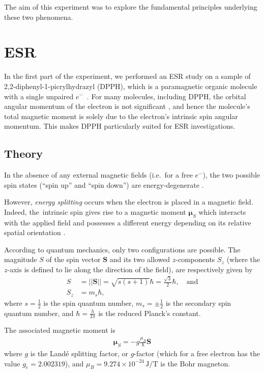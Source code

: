 \documentclass[a4paper]{jpconf}
\numberwithin{equation}{section}
\begin{document}
The aim of this experiment was to explore the fundamental principles underlying these two phenomena.

\section{ESR}
In the first part of the experiment, we performed an ESR study on a sample of 2,2-diphenyl-1-picrylhydrazyl (DPPH), which is a paramagnetic organic molecule with a single unpaired $e^-$~\cite{MacLaren}. For many molecules, including DPPH, the orbital angular momentum of the electron is not significant \cite{MacLaren},
and hence the molecule\textquoteright s total magnetic moment is solely due to the electron\textquoteright s intrinsic spin angular momentum. This makes DPPH particularly suited for ESR investigations.
 
\subsection{Theory}\label{section: theory}
In the absence of any external magnetic fields (i.e.\ for a free $e^-$), the two possible spin states (``spin up'' and ``spin down'') are energy-degenerate \cite{Yadav}.

However, \emph{energy splitting} occurs when the electron is placed in a magnetic field. Indeed, the~intrinsic spin gives rise to a magnetic moment $\bm{\mu}_S$ which interacts with the applied field and possesses a different energy depending on its relative spatial orientation \cite{Yadav}. 

According to quantum mechanics, only two configurations are possible. The magnitude $S$ of the spin vector $\mathbf{S}$ and its two allowed $z$-components $S_z$ (where the $z$-axis is defined to lie along the direction of the field), are respectively given by
\begin{align}
	S &= \lvert\lvert\mathbf{S}\rvert\rvert = \sqrt{s(s+1)}\hbar = \tfrac{\sqrt{3}}{2}\hbar,  \quad \text{and} \nonumber \\
	S_z &= m_s \hbar, \label{eqn: magnetic moment z-projection}
\end{align}
where $s=\tfrac12$ is the spin quantum number, $m_s=\pm\tfrac12$ is the secondary spin quantum number, and $\hbar = \tfrac{h}{2 \pi}$ is the reduced Planck\textquoteright s constant.

The associated magnetic moment is
\begin{align}
	\bm{\mu}_S = - g \frac{\mu_B}{\hbar} \mathbf{S} \label{eqn: magnetic moment}
\end{align}
where $g$ is the Land\'e splitting factor, or $g$-factor (which for a free electron has the value $g_e = 2.002319$), and $\mu_B = 9.274 \times 10^{-24} \, \si{\joule\per\tesla}$ is the Bohr magneton. 
\end{document}
